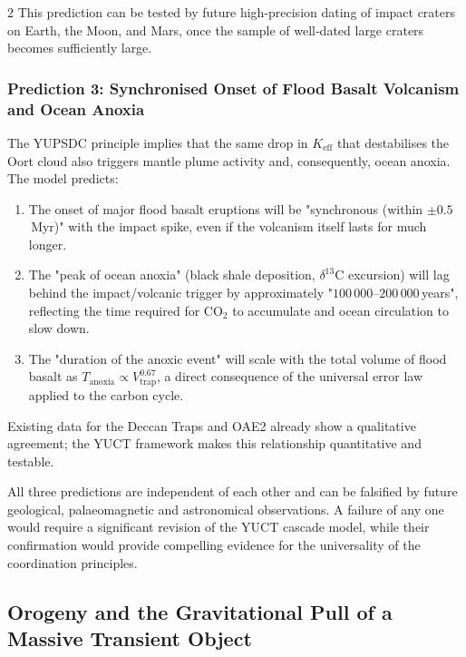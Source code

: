 \documentclass[11pt,a4paper]{article}
\begin{document}
\begin{multicols}{2}
		This prediction can be tested by future high‑precision dating of impact
		craters on Earth, the Moon, and Mars, once the sample of well‑dated large
		craters becomes sufficiently large.
		
		\subsubsection{Prediction 3: Synchronised Onset of Flood Basalt Volcanism and Ocean Anoxia}
		
		The YUPSDC principle implies that the same drop in \(K_{\mathrm{eff}}\) that
		destabilises the Oort cloud also triggers mantle plume activity and,
		consequently, ocean anoxia. The model predicts:
		
		\begin{enumerate}
			\item The onset of major flood basalt eruptions will be "synchronous
			(within \(\pm 0.5\) Myr)" with the impact spike, even if the volcanism
			itself lasts for much longer.
			\item The "peak of ocean anoxia" (black shale deposition, \(\delta^{13}\)C
			excursion) will lag behind the impact/volcanic trigger by approximately
			"\(100\,000\)–\(200\,000\) years", reflecting the time required for
			CO\(_2\) to accumulate and ocean circulation to slow down.
			\item The "duration of the anoxic event" will scale with the total
			volume of flood basalt as \(T_{\text{anoxia}} \propto V_{\text{trap}}^{0.67}\),
			a direct consequence of the universal error law applied to the carbon cycle.
		\end{enumerate}
		
		Existing data for the Deccan Traps and OAE2 already show a qualitative
		agreement; the YUCT framework makes this relationship quantitative and
		testable.
		
		All three predictions are independent of each other and can be falsified
		by future geological, palaeomagnetic and astronomical observations. A
		failure of any one would require a significant revision of the YUCT
		cascade model, while their confirmation would provide compelling evidence
		for the universality of the coordination principles.
		
		\subsection{Orogeny and the Gravitational Pull of a Massive Transient Object}
		

\end{multicols}
\end{document}
